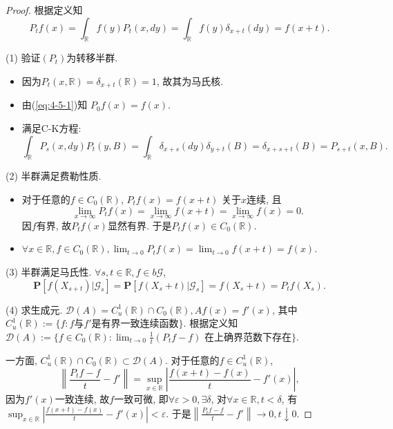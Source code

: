 \documentclass[UTF8,ondside]{ctexart}
\newcommand{\h}{\mathscr}
\newcommand{\kx}{\mathbb}
\newcommand{\mbf}{\mathbf}
\numberwithin{equation}{section}
\begin{document}
	\begin{proof}
		根据定义知
		\begin{equation}
			\label{eq:4-5-1}
			P_tf(x)=\int_{\kx R} f(y)P_t(x,dy)=\int_{\kx R} f(y)\delta_{x+t}(dy)=f(x+t).
		\end{equation}
		
		(1) 验证$(P_t)$为转移半群. 
		\begin{itemize}
			\item 因为$P_t(x,\kx R)=\delta_{x+t}(\kx R)=1$, 故其为马氏核. 
			\item 由(\ref{eq:4-5-1})知
				$P_0 f(x)=f(x)$.
			\item 满足C-K方程:
			\[
				\int_{\kx R}P_s(x,dy)P_t(y,B)
				=\int_{\kx R}\delta_{x+s}(dy)\delta_{y+t}(B)
				=\delta_{x+s+t}(B)=P_{s+t}(x,B).
			\]
		\end{itemize}

		(2) 半群满足费勒性质.  
		\begin{itemize}
			\item 对于任意的$f\in C_0(\kx R)$, $P_t f(x)=f(x+t)$ 关于$x$连续, 且
			\[
				\lim_{x\rightarrow\infty}P_t f(x)=\lim_{x\rightarrow\infty}f(x+t)=\lim_{x\rightarrow\infty}f(x)=0.
			\]
			因$f$有界, 故$P_tf(x)$显然有界. 于是$P_tf(x)\in C_0(\kx R)$.
			\item $\forall x\in\kx R,f\in C_0(\kx R), \lim_{t\rightarrow 0}P_t f(x)=\lim_{t\rightarrow 0}f(x+t)=f(x)$.
		\end{itemize}

		(3) 半群满足马氏性. $\forall s,t\in \kx R,f\in b\h G$,
		\[
			\mbf P[f(X_{s+t})|\h G_s]=\mbf P[f(X_s+t)|\h G_s]=f(X_s+t)=P_t f(X_s).
		\]

		(4) 求生成元. $\h D(A)=C_u^1(\kx R)\cap C_0(\kx R), Af(x)=f'(x)$, 其中$C_u^1(\kx R):=\{f:\text{$f$与$f'$是有界一致连续函数}\}$. 根据定义知$\h D(A):=\{f\in C_0(\kx R):\lim_{t\rightarrow 0}\frac{1}{t}(P_tf-f) \text{ 在上确界范数下存在}\}$.

		一方面, $C_u^1(\kx R)\cap C_0(\kx R)\subset \h D(A)$. 对于任意的$f\in C_u^1(\kx R)$,
			\[
				\left\| \frac{P_t f-f}{t}-f'
				 \right\|=\sup_{x\in\kx R}\left|
				 \frac{f(x+t)-f(x)}{t}-f'(x)
				 \right|,
			\]
			因为$f'(x)$一致连续, 故$f$一致可微, 即$\forall \varepsilon>0,\exists\delta$, 对$\forall x\in\kx R, t<\delta$, 有
			$
				\sup_{x\in\kx R}\left|
				\frac{f(x+t)-f(x)}{t}-f'(x)
				\right|<\varepsilon.
			$
			于是$\left\| \frac{P_t f-f}{t}-f'
			\right\|\rightarrow 0,t\downarrow 0$.


\end{proof}
\end{document}
